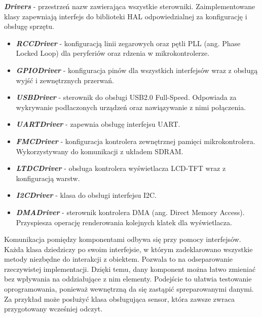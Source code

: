 \documentclass[eng,printmode]{mgr}
\begin{document}
\noindent
\textbf{\textit{Drivers}} - przestrzeń nazw zawierająca wszystkie sterowniki. Zaimplementowane klasy zapewniają interfejs do biblioteki HAL odpowiedzialnej za konfigurację i obsługę sprzętu.
\begin{itemize}[label={}]
  \item \textbf{\textit{RCCDriver}} - konfiguracją linii zegarowych oraz pętli PLL (ang. Phase Locked Loop) dla peryferiów oraz rdzenia w mikrokontrolerze. 
  \item \textbf{\textit{GPIODriver}} - konfiguracja pinów dla wszystkich interfejsów wraz z obsługą wyjść i zewnętrznych przerwań.
  \item \textbf{\textit{USBDriver}} - sterownik do obsługi USB2.0 Full-Speed. Odpowiada za wykrywanie podłaczonych urządzeń oraz nawiązywanie z nimi połączenia.
  \item \textbf{\textit{UARTDriver}} - zapewnia obsługę interfejsu UART.
  \item \textbf{\textit{FMCDriver}} - konfiguracja kontrolera zewnętrznej pamięci mikrokontrolera. Wykorzystywany do komunikacji z układem SDRAM.
  \item \textbf{\textit{LTDCDriver}} - obsługa kontrolera wyświetlacza LCD-TFT wraz z konfiguracją warstw.  
  \item \textbf{\textit{I2CDriver}} - klasa do obsługi interfejsu I2C.
  \item \textbf{\textit{DMADriver}} - sterownik kontrolera DMA (ang. Direct Memory Access). Przyspiesza operację renderowania kolejnych klatek dla wyświetlacza.
\end{itemize}


Komunikacja pomiędzy komponentami odbywa się przy pomocy interfejsów. Każda klasa dziedziczy po swoim interfejsie, w którym zadeklarowano wszystkie metody niezbędne do interakcji z obiektem. Pozwala to na odseparowanie rzeczywistej implementacji. Dzięki temu, dany komponent można łatwo zmieniać bez wpływania na oddziałujące z nim elementy. Podejście to ułatwia testowanie oprogramowania, ponieważ wewnętrzną da się zastąpić spreparowanymi danymi. Za przykład może posłużyć klasa obsługująca sensor, która zawsze zwraca przygotowany wcześniej odczyt. 
\end{document}
